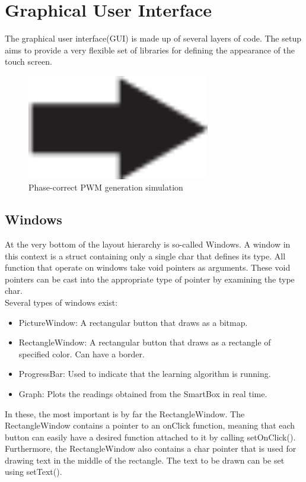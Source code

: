 \section{Graphical User Interface}
The graphical user interface(GUI) is made up of several layers of code. The setup aims to provide a very flexible set of libraries for defining the appearance of the touch screen.

\begin{figure}[H]
	\centering
	\includegraphics[width=8cm]{Figurer/derp.png}
	\caption{Phase-correct PWM generation simulation}
	\label{fig:PWM}
\end{figure}

\subsection{Windows}
At the very bottom of the layout hierarchy is so-called Windows. A window in this context is a struct containing only a single char that defines its type. All function that operate on windows take void pointers as arguments. These void pointers can be cast into the appropriate type of pointer by examining the type char.\\

\noindent
Several types of windows exist:
\begin{itemize}
\item PictureWindow: A rectangular button that draws as a bitmap.
\item RectangleWindow: A rectangular button that draws as a rectangle of specified color. Can have a border.
\item ProgressBar: Used to indicate that the learning algorithm is running.
\item Graph: Plots the readings obtained from the SmartBox in real time.
\end{itemize}

In these, the most important is by far the RectangleWindow. The RectangleWindow contains a pointer to an onClick function, meaning that each button can easily have a desired function attached to it by calling setOnClick(). Furthermore, the RectangleWindow also contains a char pointer that is used for drawing text in the middle of the rectangle. The text to be drawn can be set using setText().

